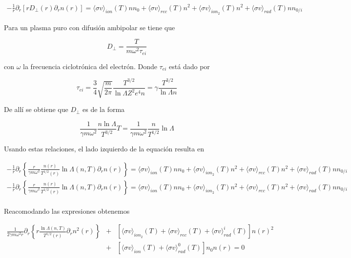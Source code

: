 \begin{eqnarray}
  -\frac{1}{r}\partial_r[rD_\perp(r) \partial_r n(r)] = \langle\sigma v\rangle_{ion}(T)nn_0 + \langle\sigma v\rangle_{rec}(T)n^2 +  \langle\sigma v\rangle_{ion_2}(T)n^2 + \langle\sigma v\rangle_{rad}(T)nn_{0/i}
\end{eqnarray}

Para un plasma puro con difusi\'on ambipolar \cite{helander2005} se tiene que 

\begin{equation*}
  D_\perp = \frac{T}{m\omega^2 \tau_{ei}}
\end{equation*}

con $\omega$ la frecuencia ciclotr\'onica del electr\'on. Donde $\tau_{ei}$ est\'a dado por \cite{hazeltine2018} 

\begin{equation*}
  \tau_{ei} = \frac{3}{4}\sqrt{\frac{m}{2\pi}}\frac{T^{3/2}}{\ln\Lambda Z^2e^4 n} = \gamma\frac{T^{3/2}}{\ln\Lambda n}
\end{equation*}

De all\'i se obtiene que $D_\perp$ es de la forma

\begin{equation}
  \frac{1}{\gamma m\omega^2}\frac{n\ln{\Lambda}}{T^{3/2}}T = \frac{1}{\gamma m\omega^2}\frac{n}{T^{1/2}}\ln{\Lambda}
\end{equation}

Usando estas relaciones, el lado izquierdo de la equaci\'on resulta en

\begin{eqnarray}
-\frac{1}{r}\partial_r\left\{\frac{r}{\gamma m\omega^2}\frac{n(r)}{T^{1/2}(r)}\ln{\Lambda(n,T)}\partial_r n(r)\right\} = \langle\sigma v\rangle_{ion}(T)nn_0 + \langle\sigma v\rangle_{ion_2}(T)n^2 + \langle\sigma v\rangle_{rec}(T)n^2+ \langle\sigma v\rangle_{rad}(T)nn_{0/i} \nonumber\\
 -\frac{1}{r}\partial_r\left\{\frac{r}{\gamma m\omega^2}\frac{n(r)}{T^{1/2}(r)}\ln{\Lambda(n,T)}\partial_r n(r)\right\} = \langle\sigma v\rangle_{ion}(T)nn_0 + \langle\sigma v\rangle_{ion_2}(T)n^2 +\langle\sigma v\rangle_{rec}(T)n^2 + \langle\sigma v\rangle_{rad}(T)nn_{0/i} \nonumber\\
\end{eqnarray}

Reacomodando las expresiones obtenemos

\begin{eqnarray}
  \frac{1}{2\gamma m\omega^2 r}\partial_r\left\{r\frac{\ln{\Lambda(n,T)}}{T^{1/2}(r)}\partial_r n^2(r)\right\} &+& [\langle\sigma v\rangle_{ion_2}(T) + \langle\sigma v\rangle_{rec}(T) + \langle\sigma v\rangle_{rad}^i(T)]n(r)^2 \nonumber \\ &+& [\langle\sigma v\rangle_{ion}(T)+ \langle\sigma v\rangle_{rad}^0(T)]n_0n(r) = 0
\end{eqnarray}

